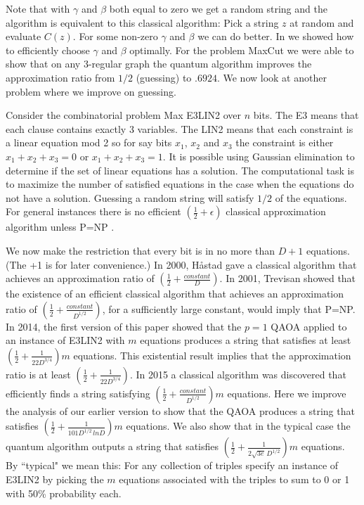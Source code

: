 \documentclass[t11pt,preprint,preprintnumbers]{revtex4}
\begin{document}
Note that with $\gamma$ and $\beta$ both equal to zero we get a random string and the algorithm is equivalent to this classical algorithm: Pick a string $z$ at random and evaluate $C(z)$.  For some non-zero $\gamma$ and $\beta$ we can do better. In \cite{farhi-2014}  we showed how to efficiently choose $\gamma$ and $\beta$ optimally. For the problem MaxCut we were able to show that on any 3-regular graph the quantum algorithm improves the approximation ratio from $1/2$ (guessing) to $.6924$.  We now look at another problem where we improve on guessing.

Consider the combinatorial problem Max E3LIN2 over $n$ bits.  The E3 means that each clause contains exactly 3 variables.  The LIN2 means that each constraint is a linear equation mod 2 so for say bits $x_1$, $x_2$ and $x_3$ the constraint is either $x_1+x_2+x_3=0$ or $x_1+x_2+x_3=1$. It is possible using Gaussian elimination to determine if the set of linear equations has a solution.  The computational task is to maximize the number of satisfied equations in the case when the equations do not have a solution.  Guessing a random string will satisfy $1/2$ of the equations.  For general instances there is no efficient $\left(\frac{1}{2} + \epsilon\right)$ classical approximation algorithm unless P=NP \cite{hastad-2001}.  

We now make the restriction that every bit is in no more than $D+1$ equations. (The +1 is for later convenience.)  In 2000, H\aa stad \cite{hastad-2000} gave a classical algorithm that achieves an approximation ratio of $\left(\frac{1}{2} + \frac{constant}{D}\right)$.  In 2001, Trevisan \cite{trevisan-2001} showed that the existence of an efficient classical algorithm that achieves an approximation ratio of $\left(\frac{1}{2} + \frac{constant}{D^{1/2}}\right)$, for a sufficiently large constant, would imply that P=NP.  In 2014, the first version of this paper showed that the $p=1$ QAOA applied to an instance of E3LIN2 with $m$ equations produces a string that satisfies at least $\left(\frac{1}{2} + \frac{1}{22 D^{3/4}}\right)m$ equations.  This existential result implies that the approximation ratio is at least $\left(\frac{1}{2} + \frac{1}{22 D^{3/4}}\right)$.  In 2015 a  classical algorithm was discovered \cite{Boaz-2015, hastad-2015} that efficiently finds a string satisfying $\left(\frac{1}{2} + \frac{constant}{ D^{1/2}}\right)m$ equations.  Here we improve the analysis of our earlier version to show that the QAOA produces a string that satisfies $\left(\frac{1}{2} + \frac{1}{101 D^{1/2} \, ln D}\right)m$ equations. We also show that in the typical case the quantum algorithm outputs a string that satisfies $\left(\frac{1}{2}+ \frac{1}{2\sqrt{3e}\, D^{1/2}}\right) m$ equations. By ``typical" we mean this: For any collection of triples  specify an instance of E3LIN2 by picking the $m$ equations associated with the triples to sum to 0 or 1 with 50\%  probability each.
\end{document}
